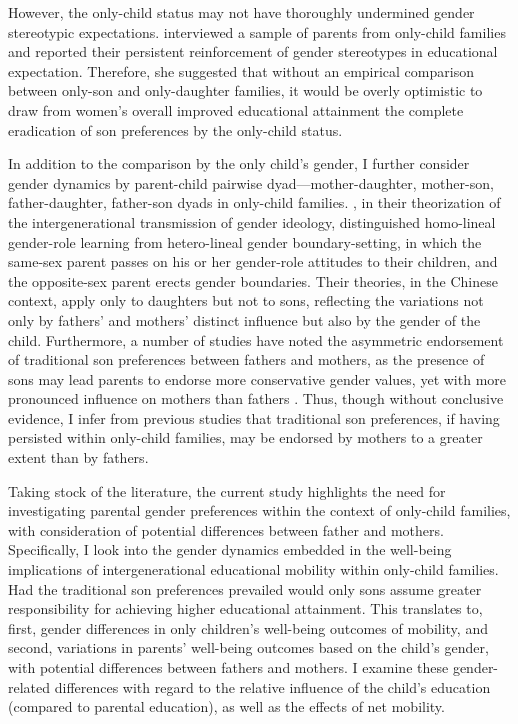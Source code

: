 However, the only-child status may not have thoroughly undermined gender stereotypic expectations. \textcite{liuBoysOnlychildrenGirls2006} interviewed a sample of parents from only-child families and reported their persistent reinforcement of gender stereotypes in educational expectation. Therefore, she suggested that without an empirical comparison between only-son and only-daughter families, it would be overly optimistic to draw from women's overall improved educational attainment the complete eradication of son preferences by the only-child status.

In addition to the comparison by the only child's gender, I further consider gender dynamics by parent-child pairwise dyad—mother-daughter, mother-son, father-daughter, father-son dyads in only-child families. \textcite{huUnmakingOccupationalGender2024}, in their theorization of the intergenerational transmission of gender ideology, distinguished homo-lineal gender-role learning from hetero-lineal gender boundary-setting, in which the same-sex parent passes on his or her gender-role attitudes to their children, and the opposite-sex parent erects gender boundaries. Their theories, in the Chinese context, apply only to daughters but not to sons, reflecting the variations not only by fathers' and mothers' distinct influence but also by the gender of the child. Furthermore, a number of studies have noted the asymmetric endorsement of traditional son preferences between fathers and mothers, as the presence of sons may lead parents to endorse more conservative gender values, yet with more pronounced influence on mothers than fathers \parencite{sunAreMothersSons2017}. Thus, though without conclusive evidence, I infer from previous studies that traditional son preferences, if having persisted within only-child families, may be endorsed by mothers to a greater extent than by fathers.

Taking stock of the literature, the current study highlights the need for investigating parental gender preferences within the context of only-child families, with consideration of potential differences between father and mothers. Specifically, I look into the gender dynamics embedded in the well-being implications of intergenerational educational mobility within only-child families. Had the traditional son preferences prevailed would only sons assume greater responsibility for achieving higher educational attainment. This translates to, first, gender differences in only children's well-being outcomes of mobility, and second, variations in parents' well-being outcomes based on the child's gender, with potential differences between fathers and mothers. I examine these gender-related differences with regard to the relative influence of the child's education (compared to parental education), as well as the effects of net mobility.
